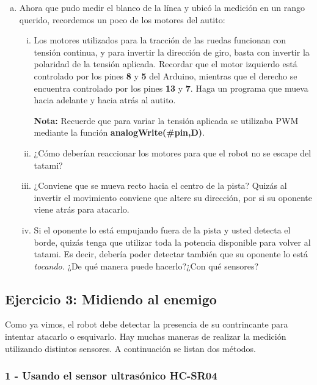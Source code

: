 \documentclass[a4paper,10pt]{article}
\begin{document}
\begin{enumerate}[(a)]
	\item Ahora que pudo medir el blanco de la línea y ubicó la medición en un rango querido, recordemos un poco de los motores del autito:
	
\begin{enumerate}[(i)]
	\item Los motores utilizados para la tracción de las ruedas funcionan con tensión continua, y para invertir la dirección de giro, 
	basta con invertir la polaridad de la tensión aplicada. Recordar que el motor izquierdo está controlado por los pines \textbf{8} y \textbf{5} 
	del Arduino, mientras que el derecho se encuentra controlado por los pines \textbf{13} y \textbf{7}. Haga un programa que mueva hacia adelante y hacia atrás 
	al autito.
	
	\textbf{Nota:} Recuerde que para variar la tensión aplicada se utilizaba PWM mediante la función \textbf{analogWrite(\#pin,D)}.

	\item ¿Cómo deberían reaccionar los motores para que el robot no se escape del tatami?
	\item ¿Conviene que se mueva recto hacia el centro de la pista? Quizás al invertir el movimiento conviene que altere su dirección, por si su oponente viene atrás para atacarlo.
	\item Si el oponente lo está empujando fuera de la pista y usted detecta el borde, quizás tenga que utilizar toda la potencia disponible para volver al tatami. Es decir, debería poder detectar también que su oponente lo está \textit{tocando}. ¿De qué manera puede hacerlo?¿Con qué sensores?

	
\end{enumerate}

\end{enumerate}

\subsection*{Ejercicio 3: Midiendo al enemigo}

Como ya vimos, el robot debe detectar la presencia de su contrincante para intentar atacarlo o esquivarlo. Hay muchas maneras de realizar la medición utilizando distintos sensores. 
A continuación se listan dos métodos.

\subsubsection*{1 - Usando el sensor ultrasónico HC-SR04}
\end{document}
